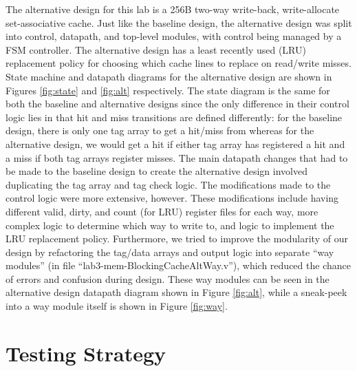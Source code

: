 \documentclass[10pt]{article}
\begin{document}
The alternative design for this lab is a 256B two-way write-back, write-allocate set-associative cache. Just like the baseline design, the alternative design was split into control, datapath, and top-level modules, with control being managed by a FSM controller. The alternative design has a least recently used (LRU) replacement policy for choosing which cache lines to replace on read/write misses. State machine and datapath diagrams for the alternative design are shown in Figures \ref{fig:state} and \ref{fig:alt} respectively. The state diagram is the same for both the baseline and alternative designs since the only difference in their control logic lies in that hit and miss transitions are defined differently: for the baseline design, there is only one tag array to get a hit/miss from whereas for the alternative design, we would get a hit if either tag array has registered a hit and a miss if both tag arrays register misses. 
The main datapath changes that had to be made to the baseline design to create the alternative design involved duplicating the tag array and tag check logic. The modifications made to the control logic were more extensive, however. These modifications include having different valid, dirty, and count (for LRU) register files for each way, more complex logic to determine which way to write to, and logic to implement the LRU replacement policy. Furthermore, we tried to improve the modularity of our design by refactoring the tag/data arrays and output logic into separate ``way modules'' (in file ``lab3-mem-BlockingCacheAltWay.v''), which reduced the chance of errors and confusion during design. These way modules can be seen in the alternative design datapath diagram shown in Figure \ref{fig:alt}, while a sneak-peek into a way module itself is shown in Figure \ref{fig:way}.  \\





\section{Testing Strategy}
\end{document}
